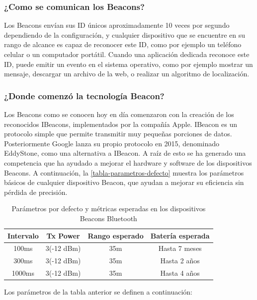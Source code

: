 \subsubsection{¿Como se comunican los Beacons?}

Los Beacons envían sus ID únicos aproximadamente 10 veces por segundo dependiendo de la configuración, y cualquier dispositivo que se encuentre en su rango de alcance es capaz de reconocer este ID, como por ejemplo un teléfono celular o un computador portátil. Cuando una aplicación dedicada reconoce este ID, puede emitir un evento en el sistema operativo, como por ejemplo mostrar un mensaje, descargar un archivo de la web, o realizar un algoritmo de localización.

\subsubsection{¿Donde comenzó la tecnología Beacon?}

Los Beacons como se conocen hoy en día comenzaron con la creación de los reconocidos IBeacons, implementados por la compañía Apple. IBeacon es un protocolo simple que permite transmitir muy pequeñas porciones de datos. Posteriormente Google lanza su propio protocolo en 2015, denominado EddyStone, como una alternativa a IBeacon. A raíz de esto se ha generado una competencia que ha ayudado a mejorar el hardware y software de los dispositivos Beacons. A continuación, la \autoref{tabla-parametros-defecto} muestra los parámetros básicos de cualquier dispositivo Beacon, que ayudan a mejorar su eficiencia sin pérdida de precisión.

\begin{table}[ht!]
\centering
\caption{Parámetros por defecto y métricas esperadas en los dispositivos Beacons Bluetooth}
\label{tabla-parametros-defecto}
\begin{tabular}{|c|c|c|c|}
\hline
Intervalo & Tx Power   & Rango esperado & Batería esperada \\ \hline
100ms     & 3(-12 dBm) & 35m            & Hasta 7 meses    \\ \hline
300ms     & 3(-12 dBm) & 35m            & Hasta 2 años     \\ \hline
1000ms    & 3(-12 dBm) & 35m            & Hasta 4 años     \\ \hline
\end{tabular}
\end{table}

Los parámetros de la tabla anterior se definen a continuación:


